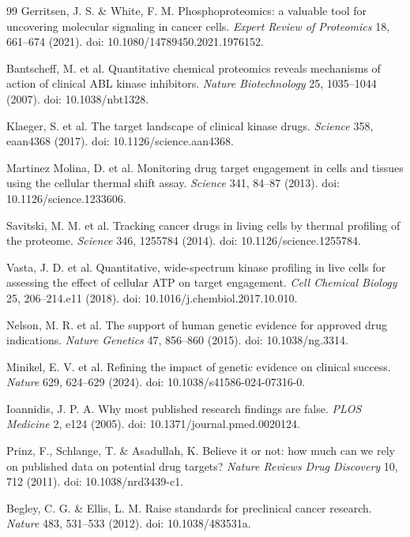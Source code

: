 {\begin{thebibliography}{99}
 Gerritsen, J. S. \& White, F. M. Phosphoproteomics: a
valuable tool for uncovering molecular signaling in cancer cells. \textit{Expert
Review of Proteomics} 18, 661--674 (2021). doi:
10.1080/14789450.2021.1976152.

 Bantscheff, M. et al. Quantitative chemical proteomics
reveals mechanisms of action of clinical ABL kinase inhibitors. \textit{Nature
Biotechnology} 25, 1035--1044 (2007). doi: 10.1038/nbt1328.

 Klaeger, S. et al. The target landscape of clinical kinase
drugs. \textit{Science} 358, eaan4368 (2017). doi: 10.1126/science.aan4368.

 Martinez Molina, D. et al. Monitoring drug target
engagement in cells and tissues using the cellular thermal shift assay.
\textit{Science} 341, 84--87 (2013). doi: 10.1126/science.1233606.

 Savitski, M. M. et al. Tracking cancer drugs in living
cells by thermal profiling of the proteome. \textit{Science} 346, 1255784
(2014). doi: 10.1126/science.1255784.

 Vasta, J. D. et al. Quantitative, wide-spectrum kinase
profiling in live cells for assessing the effect of cellular ATP on target
engagement. \textit{Cell Chemical Biology} 25, 206--214.e11 (2018). doi:
10.1016/j.chembiol.2017.10.010.

 Nelson, M. R. et al. The support of human genetic evidence
for approved drug indications. \textit{Nature Genetics} 47, 856--860 (2015).
doi: 10.1038/ng.3314.

 Minikel, E. V. et al. Refining the impact of genetic
evidence on clinical success. \textit{Nature} 629, 624--629 (2024). doi:
10.1038/s41586-024-07316-0.

 Ioannidis, J. P. A. Why most published research findings
are false. \textit{PLOS Medicine} 2, e124 (2005). doi:
10.1371/journal.pmed.0020124.

 Prinz, F., Schlange, T. \& Asadullah, K. Believe it or not:
how much can we rely on published data on potential drug targets?
\textit{Nature Reviews Drug Discovery} 10, 712 (2011). doi:
10.1038/nrd3439-c1.

 Begley, C. G. \& Ellis, L. M. Raise standards for
preclinical cancer research. \textit{Nature} 483, 531--533 (2012). doi:
10.1038/483531a.


\end{thebibliography}}
